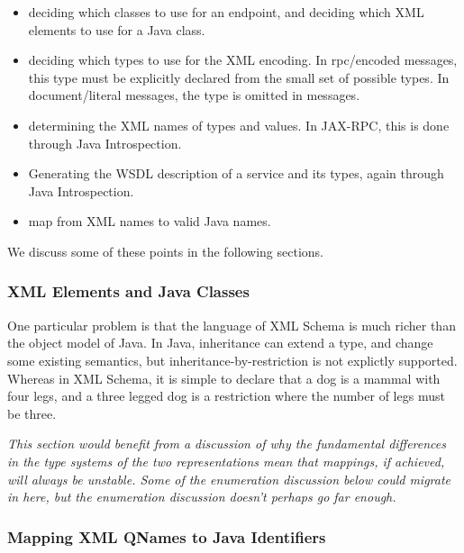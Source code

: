 \begin{itemize}

\item deciding which classes to use for an endpoint, and
deciding which XML elements to use for a Java class. 

\item deciding which types to use for the XML encoding. In rpc/encoded messages,
this type must be explicitly declared from the small set of possible types. In
document/literal messages, the type is omitted in messages. 

\item determining the XML names of types and values. In JAX-RPC, this is
done through Java Introspection.

\item Generating the WSDL description of a service and its types,
again through Java Introspection.

\item map from XML names to valid Java names.

\end{itemize}

We discuss some of these points in the following sections.

\subsubsection{XML Elements and Java Classes}
\label{objections:o-x:xml-classes}

One particular problem is that the language of XML Schema is much
richer than the object model of Java. In Java, inheritance can extend
a type, and change some existing semantics, but
inheritance-by-restriction is not explictly supported. Whereas in XML
Schema, it is simple to declare that a dog is a mammal with four legs,
and a three legged dog is a restriction where the number of legs must
be three.

\emph{This section would benefit from a discussion of why the
fundamental differences in the type systems of the two representations
mean that mappings, if achieved, will always be unstable. Some of the
enumeration discussion below could migrate in here, but the
enumeration discussion doesn't perhaps go far enough.}

\subsubsection{Mapping XML QNames to Java Identifiers}
\label{objections:o-x:names}

